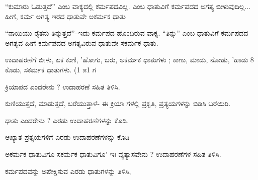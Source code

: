 \indent “ಕುಮಾರು ಓಡುತ್ತದೆ” ಎಂಬ ವಾಕ್ಯದಲ್ಲಿ ಕರ್ಮಪದವಿಲ್ಲ. ಎಂಬ ಧಾತುವಿಗೆ ಕರ್ಮಪದದ ಅಗತ್ಯ ಬೀಳುವುದಿಲ್ಲ... ಹೀಗೆ, ಕರ್ಮ ಅಗತ್ಯ ಇರದ ಧಾತುವೇ ಅಕರ್ಮಕ ಧಾತು\par

\indent “ನಾಯಿಯು ರೈತನು ತಿನ್ನುತ್ತದೆ”--ಇದು ಕರ್ಮಪದ ಹೊಂದಿರುವ ವಾಕ್ಯ. “ತಿನ್ನು” ಎಂಬ ಧಾತುವಿಗೆ ಕರ್ಮಪದದ ಅಗತ್ಯವ ಹೀಗೆ ಕರ್ಮಪದದ ಅಗತ್ಯವಿರುವ ಧಾತುವೇ ಸಕರ್ಮಕ ಧಾತು.\par

\indent ಉದಾಹರಣೆಗೆ ಬೀಳು, ಏಕ ಕುಣಿ, 'ಹೋಗು, ಬರು, ಅಕರ್ಮಕ ಧಾತುಗಳು ; ಕಾಣು, ಮಾಡು, ನೋಡು, 'ಹಾಡು 8 ಕೊಡು, ಸಕರ್ಮಕ ಧಾತುಗಳು. (1 ೫1 ಗ\par


\vspace{2.5pt plus 3pt minus 0.5pt}\noindent\hspace*{1.2em}\hspace{0.55em}ಕ್ರಿಯಾಪದ ಎಂದರೇನು ? ಉದಾಹರಣೆ ಸಹಿತ ತಿಳಿಸಿ.\par

\vspace{2.5pt plus 3pt minus 0.5pt}\noindent\hspace*{1.2em}\hspace{0.55em}ಕುಣಿಯುತ್ತದೆ, ಮಾಡುತ್ತದೆ, ಬರೆಯುತ್ತಾಳೆ- ಈ ಕ್ರಿಯಾ ಗಳಲ್ಲಿ ಪ್ರಕೃತಿ, ಪ್ರತ್ಯಯಗಳನ್ನು ಬಿಡಿಸಿ ಬರೆಯಿರಿ.\par

\vspace{2.5pt plus 3pt minus 0.5pt}\noindent\hspace*{1.2em}\hspace{0.55em}ಧಾತು ಎಂದರೇನು ? ಎರಡು ಉದಾಹರಣೆಗಳನ್ನು ಕೊಡಿ.\par

\vspace{2.5pt plus 3pt minus 0.5pt}\noindent\hspace*{1.2em}\hspace{0.55em}ಆಖ್ಯಾತ ಪ್ರತ್ಯಯಗಳಿಗೆ ಎರಡು ಉದಾಹರಣೆಗಳನ್ನು ಕೊಡಿ\par

\vspace{2.5pt plus 3pt minus 0.5pt}\noindent\hspace*{1.2em}\hspace{0.55em}ಅಕರ್ಮಕ ಧಾತುವಿಗೂ ಸಕರ್ಮಕ ಧಾತುವಿಗೂ' ಇಃ ವ್ಯತ್ಯಾಸವೇನು ? ಉದಾಹರಣೆಗಳ ಸಹಿತ ತಿಳಿಸಿ.\par

\vspace{2.5pt plus 3pt minus 0.5pt}\noindent\hspace*{1.2em}\hspace{0.55em}ಕರ್ಮಪದವನ್ನು ಅಪೇಕ್ಷಿಸುವ ಎರಡು ಧಾತುಗಳನ್ನು ತಿಳಿಸಿ,\par

